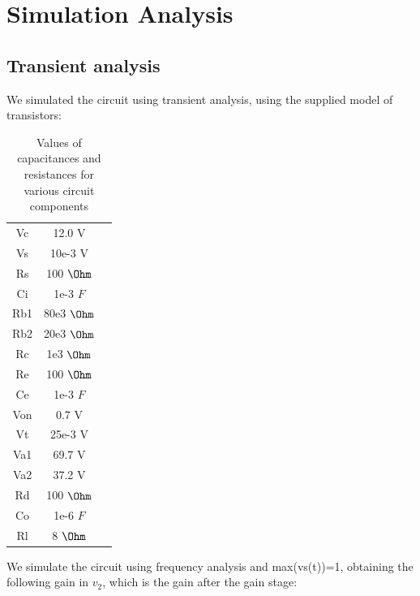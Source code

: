 \section{Simulation Analysis}
\label{sec:simulation}

\subsection{Transient analysis}

We simulated the circuit using transient analysis, using the supplied model of transistors:

\begin{table}[H]
\addtolength{\tabcolsep}{-4pt}
\caption{Values of capacitances and resistances for various circuit components}
\vspace{-3mm}
\begin{tabular}{|c|c|c|}
\hline
Vc & 12.0 V\\
Vs & 10e-3 V\\
Rs & 100 $\Ohm$\\
Ci & 1e-3 $F$\\
Rb1& 80e3 $\Ohm$\\
Rb2&20e3 $\Ohm$\\
Rc & 1e3 $\Ohm$\\
Re &100 $\Ohm$\\
Ce & 1e-3 $F$\\
Von&0.7 V\\
Vt&25e-3 V\\
Va1&69.7 V\\
Va2&37.2 V\\
Rd & 100 $\Ohm$\\
Co & 1e-6 $F$\\
Rl & 8 $\Ohm$\\

\hline
\end{tabular}
\label{tab:Components}
\end{table}

\par

We simulate the circuit using frequency analysis and max(vs(t))=1, obtaining the following gain in $v_2$, which is the gain after the gain stage:


